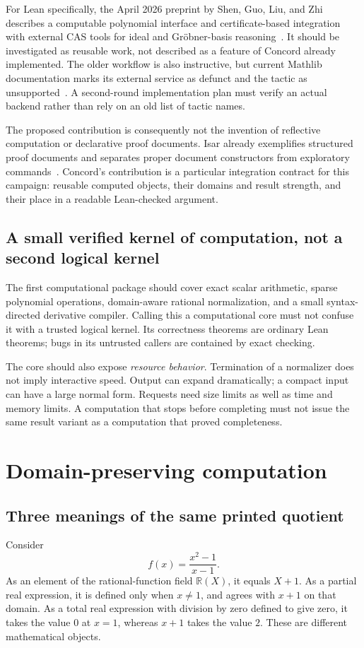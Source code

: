\documentclass[11pt,a4paper]{article}
\newcommand{\code}[1]{\texttt{\detokenize{#1}}}
\newcommand{\R}{\mathbb R}
\theoremstyle{remark}
\begin{document}
For Lean specifically, the April 2026 preprint by Shen, Guo, Liu, and Zhi describes
a computable polynomial interface and certificate-based integration with external
CAS tools for ideal and Gr\"obner-basis reasoning~\cite{shen}. It should be
investigated as reusable work, not described as a feature of Concord already
implemented. The older \code{polyrith} workflow is also instructive, but current
Mathlib documentation marks its external service as defunct and the tactic as
unsupported~\cite{polyrith}. A second-round implementation plan must verify an
actual backend rather than rely on an old list of tactic names.

The proposed contribution is consequently not the invention of reflective
computation or declarative proof documents. Isar already exemplifies structured
proof documents and separates proper document constructors from exploratory
commands~\cite{isar}. Concord's contribution is a particular integration contract
for this campaign: reusable computed objects, their domains and result strength,
and their place in a readable Lean-checked argument.

\subsection{A small verified kernel of computation, not a second logical kernel}
The first computational package should cover exact scalar arithmetic, sparse
polynomial operations, domain-aware rational normalization, and a small
syntax-directed derivative compiler. Calling this a computational core must not
confuse it with a trusted logical kernel. Its correctness theorems are ordinary
Lean theorems; bugs in its untrusted callers are contained by exact checking.

The core should also expose \emph{resource behavior}. Termination of a normalizer
does not imply interactive speed. Output can expand dramatically; a compact
input can have a large normal form. Requests need size limits as well as time and
memory limits. A computation that stops before completing must not issue the
same result variant as a computation that proved completeness.

\section{Domain-preserving computation}
\label{sec:domains}
\subsection{Three meanings of the same printed quotient}
Consider
\[
 f(x)=\frac{x^2-1}{x-1}.
\]
As an element of the rational-function field $\R(X)$, it equals $X+1$.
As a partial real expression, it is defined only when $x\ne1$, and agrees with
$x+1$ on that domain. As a total real expression with division by zero defined
to give zero, it takes the value $0$ at $x=1$, whereas $x+1$ takes the value $2$.
These are different mathematical objects.
\end{document}
